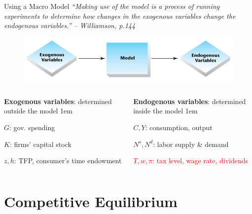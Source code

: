 \documentclass[11pt,aspectratio=43]{beamer}
\newcommand{\red}[1]{\textcolor{red}{#1}}
\let\olditemize=\itemize
\let\endolditemize=\enditemize
\renewenvironment{itemize}{\olditemize \itemsep1em}{\endolditemize}
\let\oldenumerate=\enumerate
\let\endoldenumerate=\endenumerate
\renewenvironment{enumerate}{\oldenumerate \itemsep1em}{ \endoldenumerate}
\theoremstyle{definition}
\begin{document}
\begin{frame}{Using a Macro Model}
\label{slide:Using_a_Macro_Model}
        \textit{\scriptsize ``Making use of the model is a process of running experiments to determine how changes in the exogenous variables change the endogenous variables.'' – Williamson, p.144}
    \begin{figure}
        \includegraphics[width=\textwidth]{./figures/MacroModelStructure.jpg}
    \end{figure}
    \begin{columns}
        \begin{column}{0.5\textwidth}
            \textbf{Exogenous variables}: determined \alert{outside} the model
            \begin{enumerate}
                \item $ G $: gov. spending
                \item $ K $: firms' capital stock
                \item $ z, h $: TFP, consumer's time endowment
            \end{enumerate}
        \end{column}
        \begin{column}{0.5\textwidth}
            \textbf{Endogenous variables}: determined \alert{inside} the model
            \begin{itemize}
                \item $ C, Y$: consumption, output
                \item $ N^{s}, N^{d} $: labor supply \& demand
                \item \red{$ T, w, \pi $: tax level, wage rate, dividends}
            \end{itemize}
        \end{column}
    \end{columns}
\end{frame}

\section{Competitive Equilibrium}
\label{sec:Competitive_Equilibrium}
\end{document}
